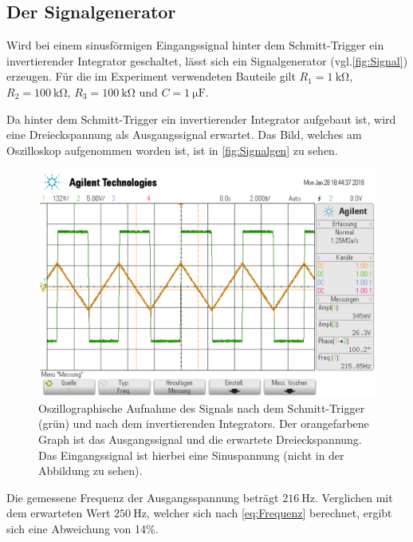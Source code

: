 \subsection{Der Signalgenerator \cite{signal}}
Wird bei einem sinusförmigen Eingangssignal hinter dem Schmitt-Trigger ein invertierender Integrator geschaltet, lässt sich 
ein Signalgenerator (vgl.\autoref{fig:Signal}) erzeugen. 
Für die im Experiment verwendeten Bauteile gilt $R_1 = \SI{1}{\kilo\ohm}$, $R_2 = \SI{100}{\kilo\ohm}$,
$R_3 = \SI{100}{\kilo\ohm}$ und $C = \SI{1}{\micro\farad}$.\cite{signal}

Da hinter dem Schmitt-Trigger ein invertierender Integrator aufgebaut ist, wird eine Dreieckspannung
als Ausgangssignal erwartet.
Das Bild, welches am Oszilloskop aufgenommen worden ist, ist in \autoref{fig:Signalgen}
zu sehen.
\begin{figure}
    \centering
    \includegraphics[width=0.7\linewidth]{data_of_others_cuz_ours_suck/Signal/Bildschirmfoto vom 2022-02-11 13-19-10.png}
    \caption{Oszillographische Aufnahme des Signals nach dem Schmitt-Trigger (grün) und 
    nach dem invertierenden Integrators. Der orangefarbene Graph ist das Ausgangssignal und die erwartete
    Dreieckspannung.\cite{signal} Das Eingangssignal ist hierbei eine Sinuspannung (nicht in der Abbildung zu sehen).}
    \label{fig:Signalgen}
\end{figure}
\FloatBarrier

Die gemessene Frequenz der Ausgangsspannung beträgt $\SI{216}{\hertz}$.
Verglichen mit dem erwarteten Wert $\SI{250}{\hertz}$, welcher sich nach \autoref{eq:Frequenz}
berechnet, ergibt sich eine Abweichung von 14\%.

%

